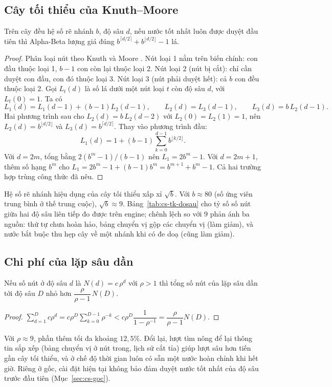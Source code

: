 \subsection{Cây tối thiểu của Knuth--Moore}
\begin{dinhly}
\label{dl:cs-knuth-moore}
Trên cây đều hệ số rẽ nhánh $b$, độ sâu $d$, nếu nước tốt nhất luôn được duyệt đầu tiên thì Alpha-Beta lượng giá
đúng $b^{\lceil d/2\rceil}+b^{\lfloor d/2\rfloor}-1$ lá.
\end{dinhly}
\begin{proof}
Phân loại nút theo Knuth và Moore \cite{knuth1975alphabeta}. Nút loại 1 nằm trên biến chính: con đầu thuộc loại
1, $b-1$ con còn lại thuộc loại 2. Nút loại 2 (nút bị cắt): chỉ cần duyệt con đầu, con đó thuộc loại 3. Nút loại
3 (nút phải duyệt hết): cả $b$ con đều thuộc loại 2. Gọi $L_t(d)$ là số lá dưới một nút loại $t$ còn độ sâu $d$,
với $L_t(0)=1$. Ta có
\[
  L_1(d)=L_1(d-1)+(b-1)L_2(d-1),\qquad L_2(d)=L_3(d-1),\qquad L_3(d)=b\,L_2(d-1).
\]
Hai phương trình sau cho $L_2(d)=b\,L_2(d-2)$ với $L_2(0)=L_2(1)=1$, nên $L_2(d)=b^{\lfloor d/2\rfloor}$ và
$L_3(d)=b^{\lceil d/2\rceil}$. Thay vào phương trình đầu:
\[
  L_1(d)=1+(b-1)\sum_{k=0}^{d-1}b^{\lfloor k/2\rfloor}.
\]
Với $d=2m$, tổng bằng $2(b^m-1)/(b-1)$ nên $L_1=2b^m-1$. Với $d=2m+1$, thêm số hạng $b^m$ cho
$L_1=2b^m-1+(b-1)b^m=b^{m+1}+b^m-1$. Cả hai trường hợp trùng công thức đã nêu.
\end{proof}
Hệ số rẽ nhánh hiệu dụng của cây tối thiểu xấp xỉ $\sqrt b$. Với $b\approx 80$ (số ứng viên trung bình ở thế
trung cuộc), $\sqrt b\approx 9$. Bảng~\ref{tab:cs-tk-dosau} cho tỷ số số nút giữa hai độ sâu liên tiếp đo được
trên engine; chênh lệch so với 9 phản ánh ba nguồn: thứ tự chưa hoàn hảo, bảng chuyển vị gộp các chuyển vị (làm
giảm), và nước bắt buộc thu hẹp cây về một nhánh khi có đe doạ (cũng làm giảm).

\subsection{Chi phí của lặp sâu dần}
\begin{dinhly}
Nếu số nút ở độ sâu $d$ là $N(d)=c\,\rho^d$ với $\rho>1$ thì tổng số nút của lặp sâu dần tới độ sâu $D$ nhỏ hơn
$\dfrac{\rho}{\rho-1}\,N(D)$.
\end{dinhly}
\begin{proof}
$\sum_{d=1}^{D}c\rho^d = c\rho^D\sum_{k=0}^{D-1}\rho^{-k}<c\rho^D\dfrac{1}{1-\rho^{-1}}=\dfrac{\rho}{\rho-1}N(D)$.
\end{proof}
Với $\rho\approx9$, phần thêm tối đa khoảng $12{,}5\%$. Đổi lại, lượt tìm nông để lại thông tin sắp xếp (bảng
chuyển vị ở nút trong, lịch sử cắt tỉa) giúp lượt sâu hơn tiến gần cây tối thiểu, và ở chế độ thời gian luôn có
sẵn một nước hoàn chỉnh khi hết giờ. Riêng ở gốc, cài đặt hiện tại không bảo đảm duyệt nước tốt nhất của độ sâu
trước đầu tiên (Mục~\ref{sec:cs-goc}).


